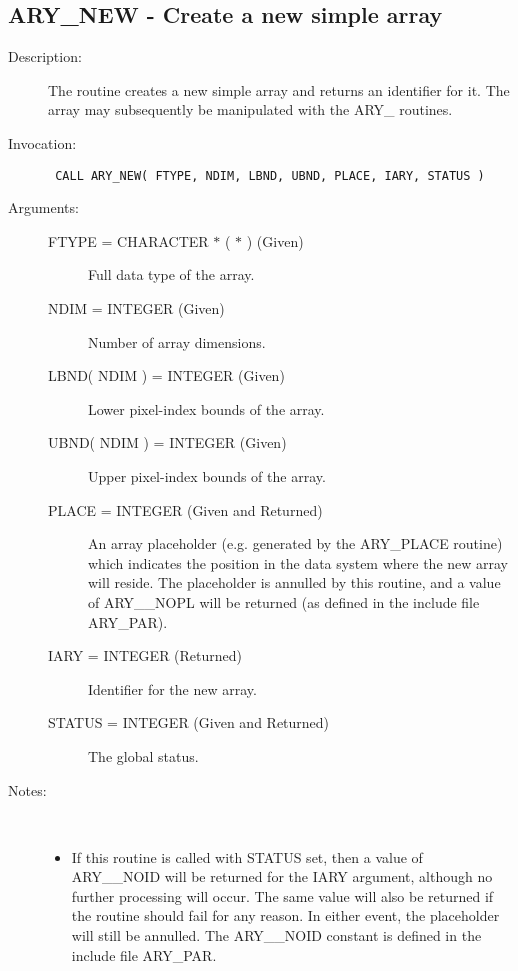 \documentclass[twoside,11pt]{article}
\newcommand{\xlabel}[1]{}
\newlength{\sstbannerlength}
\newlength{\sstcaptionlength}
\newlength{\sstexampleslength}
\newlength{\sstexampleswidth}
\newcommand{\sstroutine}[3]{
   \goodbreak
   \rule{\textwidth}{0.5mm}
   \vspace{-7ex}
   \newline
   \settowidth{\sstbannerlength}{{\Large {\bf #1}}}
   \setlength{\sstcaptionlength}{\textwidth}
   \setlength{\sstexampleslength}{\textwidth}
   \addtolength{\sstbannerlength}{0.5em}
   \addtolength{\sstcaptionlength}{-2.0\sstbannerlength}
   \addtolength{\sstcaptionlength}{-5.0pt}
   \settowidth{\sstexampleswidth}{{\bf Examples:}}
   \addtolength{\sstexampleslength}{-\sstexampleswidth}
   \parbox[t]{\sstbannerlength}{\flushleft{\Large {\bf #1}}}
   \parbox[t]{\sstcaptionlength}{\center{\Large #2}}
   \parbox[t]{\sstbannerlength}{\flushright{\Large {\bf #1}}}
   \begin{description}
      #3
   \end{description}
}
\newcommand{\sstdescription}[1]{\item[Description:] #1}
\newcommand{\sstinvocation}[1]{\item[Invocation:]\hspace{0.4em}{\tt #1}}
\newcommand{\sstarguments}[1]{
   \item[Arguments:] \mbox{} \\
   \vspace{-3.5ex}
   \begin{description}
      #1
   \end{description}
}
\newcommand{\sstsubsection}[1]{ \item[{#1}] \mbox{} \\}
\newcommand{\sstnotes}[1]{\item[Notes:] \mbox{} \\[1.3ex] #1}
\newcommand{\sstitemlist}[1]{
  \mbox{} \\
  \vspace{-3.5ex}
  \begin{itemize}
     #1
  \end{itemize}
}
\newcommand{\sstitem}{\item}
\newcommand{\ssttt}{\tt}
\renewcommand{\sstroutine}[3]{
      \subsection{#1\xlabel{#1}-\label{#1}#2}
      \begin{description}
         #3
      \end{description}
   }
\renewcommand{\sstdescription}[1]{\item[Description:]
      \begin{description}
         #1
      \end{description}
   }
\renewcommand{\sstinvocation}[1]{\item[Invocation:]
      \begin{description}
         {\ssttt #1}
      \end{description}
   }
\renewcommand{\sstarguments}[1]{
      \item[Arguments:]
      \begin{description}
         #1
      \end{description}
   }
\renewcommand{\sstsubsection}[1]{\item[{#1}]}
\renewcommand{\sstnotes}[1]{\item[Notes:]
      \begin{description}
         #1
      \end{description}
   }
\newcommand{\sstitemlist}[1]{
      \begin{itemize}
         #1
      \end{itemize}
   }
\begin{document}
\sstroutine{
   ARY\_NEW
}{
   Create a new simple array
}{
   \sstdescription{
      The routine creates a new simple array and returns an identifier
      for it. The array may subsequently be manipulated with the ARY\_
      routines.
   }
   \sstinvocation{
      CALL ARY\_NEW( FTYPE, NDIM, LBND, UBND, PLACE, IARY, STATUS )
   }
   \sstarguments{
      \sstsubsection{
         FTYPE = CHARACTER $*$ ( $*$ ) (Given)
      }{
         Full data type of the array.
      }
      \sstsubsection{
         NDIM = INTEGER (Given)
      }{
         Number of array dimensions.
      }
      \sstsubsection{
         LBND( NDIM ) = INTEGER (Given)
      }{
         Lower pixel-index bounds of the array.
      }
      \sstsubsection{
         UBND( NDIM ) = INTEGER (Given)
      }{
         Upper pixel-index bounds of the array.
      }
      \sstsubsection{
         PLACE = INTEGER (Given and Returned)
      }{
         An array placeholder (e.g. generated by the ARY\_PLACE routine)
         which indicates the position in the data system where the new
         array will reside. The placeholder is annulled by this
         routine, and a value of ARY\_\_NOPL will be returned (as defined
         in the include file ARY\_PAR).
      }
      \sstsubsection{
         IARY = INTEGER (Returned)
      }{
         Identifier for the new array.
      }
      \sstsubsection{
         STATUS = INTEGER (Given and Returned)
      }{
         The global status.
      }
   }
   \sstnotes{
      \sstitemlist{

         \sstitem
         If this routine is called with STATUS set, then a value of
         ARY\_\_NOID will be returned for the IARY argument, although no
         further processing will occur. The same value will also be
         returned if the routine should fail for any reason. In either
         event, the placeholder will still be annulled. The ARY\_\_NOID
         constant is defined in the include file ARY\_PAR.
      }
   }
}
\end{document}
